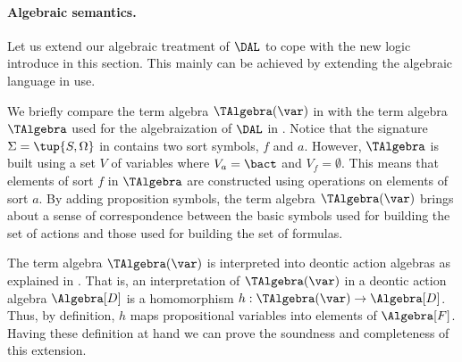 

\paragraph{Algebraic semantics.} Let us  extend our algebraic treatment of $\DAL$ to cope with the new logic introduce in this section.  This mainly can be achieved by extending  the algebraic language in use.

\medskip

\medskip


\medskip


 We briefly compare the term algebra $\TAlgebra(\var)$ in  with the term algebra $\TAlgebra$ used for the algebraization of $\DAL$ in .
 Notice that the signature $\Sigma = \tup{S, \Omega}$ in  contains two sort symbols, $f$  and  $a$.
 However, $\TAlgebra$ is built using a set $V$ of variables where $V_a = \bact$ and $V_f = \emptyset$.
 This means that elements of sort $f$ in $\TAlgebra$ are constructed using operations on elements of sort $a$.
 By adding proposition symbols, the term algebra $\TAlgebra(\var)$ brings about a sense of correspondence between the basic symbols used for building the set of actions and those used for building the set of formulas.

The term algebra $\TAlgebra(\var)$ is interpreted into deontic action algebras as explained in . That is, an interpretation of $\TAlgebra(\var)$ in a deontic action algebra 
$\Algebra[D]$ is a homomorphism $h:\TAlgebra(\var) \rightarrow \Algebra[D]$. Thus, by definition,  $h$ maps propositional variables into elements of $\Algebra[F]$.  Having these definition at hand we can prove the soundness and completeness of this extension.

